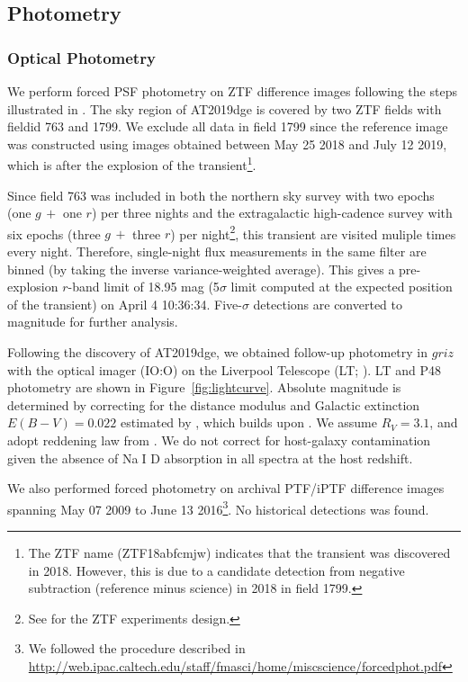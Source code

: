 \documentclass[twocolumn]{aastex63}
\def\ion#1#2{#1$\;${\footnotesize\rm{#2}}\relax}
\begin{document}
\begin{CJK*}{UTF8}{gbsn}
 
\subsection{Photometry}
\subsubsection{Optical Photometry}
We perform forced PSF photometry on ZTF difference images following the steps illustrated in 
\citet{Yao2019}. The sky region of AT2019dge is covered by two ZTF fields with fieldid 763 and 
1799. We exclude all data in field 1799 since the reference image was constructed using images 
obtained between May 25 2018 and July 12 2019, which is after the explosion of the 
transient\footnote{The ZTF name (ZTF18abfcmjw) indicates that the transient was discovered in 2018. 
However, this is due to a candidate detection from negative subtraction (reference minus science) in 
2018 in field 1799.}.

Since field 763 was included in both the northern sky survey with two epochs (one 
$g\, +$ one $r$) per three nights and the extragalactic high-cadence survey with six epochs (three 
$g\,+$ three $r$) per night\footnote{See \citet{Bellm2019a} for the ZTF experiments design.}, this 
transient are visited muliple times every night. Therefore, single-night flux measurements in the same 
filter are binned (by taking the inverse variance-weighted average). This gives a pre-explosion 
$r$-band limit of 18.95 mag (5$\sigma$ limit computed at the expected position of the transient) on 
April 4 10:36:34. Five-$\sigma$ detections are converted to magnitude for further analysis.

Following the discovery of AT2019dge, we obtained follow-up photometry in $griz$ with the optical 
imager (IO:O) on the Liverpool Telescope (LT; \citealt{Steele2004}). LT and P48 photometry are shown 
in Figure~\ref{fig:lightcurve}. Absolute magnitude is determined by correcting for the distance modulus 
and Galactic extinction $E(B-V)=0.022$ estimated by \citet{Schlafly2011}, which builds upon 
\citet{Schlegel1998}. We assume $R_V=3.1$, and adopt reddening law from \citet{Cardelli1989}. We do 
not correct for host-galaxy contamination given the absence of \ion{Na}{I} D absorption in all spectra 
at the host redshift. 

We also performed forced photometry on archival PTF/iPTF difference images spanning May 07 2009 to 
June 13 2016\footnote{We followed the procedure described in 
	\url{http://web.ipac.caltech.edu/staff/fmasci/home/miscscience/forcedphot.pdf}}. No historical 
detections was found. 

\end{CJK*}
\end{document}
